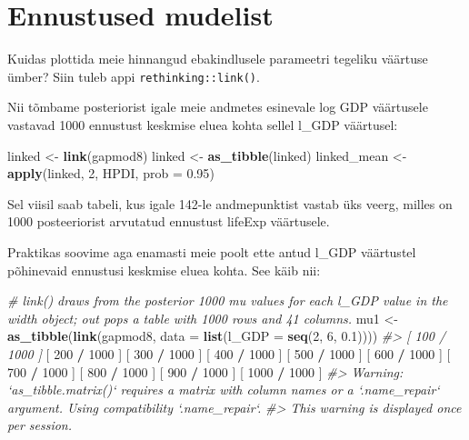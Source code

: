 \documentclass[]{book}
\newenvironment{Shaded}{\begin{snugshade}}{\end{snugshade}}
\newcommand{\KeywordTok}[1]{\textcolor[rgb]{0.13,0.29,0.53}{\textbf{#1}}}
\newcommand{\DataTypeTok}[1]{\textcolor[rgb]{0.13,0.29,0.53}{#1}}
\newcommand{\DecValTok}[1]{\textcolor[rgb]{0.00,0.00,0.81}{#1}}
\newcommand{\FloatTok}[1]{\textcolor[rgb]{0.00,0.00,0.81}{#1}}
\newcommand{\StringTok}[1]{\textcolor[rgb]{0.31,0.60,0.02}{#1}}
\newcommand{\CommentTok}[1]{\textcolor[rgb]{0.56,0.35,0.01}{\textit{#1}}}
\newcommand{\OperatorTok}[1]{\textcolor[rgb]{0.81,0.36,0.00}{\textbf{#1}}}
\newcommand{\NormalTok}[1]{#1}
\begin{document}
\section*{Ennustused mudelist}\label{ennustused-mudelist}

Kuidas plottida meie hinnangud ebakindlusele parameetri tegeliku
väärtuse ümber? Siin tuleb appi \texttt{rethinking::link()}.

Nii tõmbame posteriorist igale meie andmetes esinevale log GDP
väärtusele vastavad 1000 ennustust keskmise eluea kohta sellel l\_GDP
väärtusel:

\begin{Shaded}
\begin{Highlighting}[]
\NormalTok{linked <-}\StringTok{ }\KeywordTok{link}\NormalTok{(gapmod8)}
\NormalTok{linked <-}\StringTok{ }\KeywordTok{as_tibble}\NormalTok{(linked)}
\NormalTok{linked_mean <-}\StringTok{ }\KeywordTok{apply}\NormalTok{(linked, }\DecValTok{2}\NormalTok{, HPDI, }\DataTypeTok{prob =} \FloatTok{0.95}\NormalTok{)}
\end{Highlighting}
\end{Shaded}

Sel viisil saab tabeli, kus igale 142-le andmepunktist vastab üks veerg,
milles on 1000 posteeriorist arvutatud ennustust lifeExp väärtusele.

Praktikas soovime aga enamasti meie poolt ette antud l\_GDP väärtustel
põhinevaid ennustusi keskmise eluea kohta. See käib nii:

\begin{Shaded}
\begin{Highlighting}[]
\CommentTok{# link() draws from the posterior 1000 mu values for each l_GDP value in the width object; out pops a table with 1000 rows and 41 columns. }
\NormalTok{mu1 <-}\StringTok{ }\KeywordTok{as_tibble}\NormalTok{(}\KeywordTok{link}\NormalTok{(gapmod8, }\DataTypeTok{data =} \KeywordTok{list}\NormalTok{(}\DataTypeTok{l_GDP =} \KeywordTok{seq}\NormalTok{(}\DecValTok{2}\NormalTok{, }\DecValTok{6}\NormalTok{, }\FloatTok{0.1}\NormalTok{))))}
\CommentTok{#> [ 100 / 1000 ]}
\NormalTok{[ }\DecValTok{200} \OperatorTok{/}\StringTok{ }\DecValTok{1000}\NormalTok{ ]}
\NormalTok{[ }\DecValTok{300} \OperatorTok{/}\StringTok{ }\DecValTok{1000}\NormalTok{ ]}
\NormalTok{[ }\DecValTok{400} \OperatorTok{/}\StringTok{ }\DecValTok{1000}\NormalTok{ ]}
\NormalTok{[ }\DecValTok{500} \OperatorTok{/}\StringTok{ }\DecValTok{1000}\NormalTok{ ]}
\NormalTok{[ }\DecValTok{600} \OperatorTok{/}\StringTok{ }\DecValTok{1000}\NormalTok{ ]}
\NormalTok{[ }\DecValTok{700} \OperatorTok{/}\StringTok{ }\DecValTok{1000}\NormalTok{ ]}
\NormalTok{[ }\DecValTok{800} \OperatorTok{/}\StringTok{ }\DecValTok{1000}\NormalTok{ ]}
\NormalTok{[ }\DecValTok{900} \OperatorTok{/}\StringTok{ }\DecValTok{1000}\NormalTok{ ]}
\NormalTok{[ }\DecValTok{1000} \OperatorTok{/}\StringTok{ }\DecValTok{1000}\NormalTok{ ]}
\CommentTok{#> Warning: `as_tibble.matrix()` requires a matrix with column names or a `.name_repair` argument. Using compatibility `.name_repair`.}
\CommentTok{#> This warning is displayed once per session.}
\end{Highlighting}
\end{Shaded}
\end{document}
